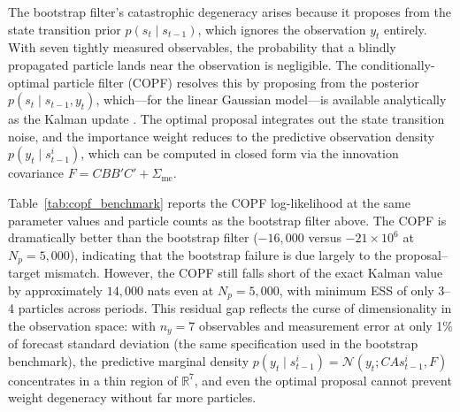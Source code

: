 \documentclass[12pt]{article}
\theoremstyle{plain}
\theoremstyle{definition}
\theoremstyle{remark}
\begin{document}
The bootstrap filter's catastrophic degeneracy arises because it proposes from the state transition prior $p(s_t \mid s_{t-1})$, which ignores the observation $y_t$ entirely. With seven tightly measured observables, the probability that a blindly propagated particle lands near the observation is negligible. The conditionally-optimal particle filter (COPF) resolves this by proposing from the posterior $p(s_t \mid s_{t-1}, y_t)$, which---for the linear Gaussian model---is available analytically as the Kalman update \citep{doucet2001sequential,fernandezvillaverde2007estimating}. The optimal proposal integrates out the state transition noise, and the importance weight reduces to the predictive observation density $p(y_t \mid s_{t-1}^i)$, which can be computed in closed form via the innovation covariance $F = C B B' C' + \Sigma_{\text{me}}$.

Table~\ref{tab:copf_benchmark} reports the COPF log-likelihood at the same parameter values and particle counts as the bootstrap filter above. The COPF is dramatically better than the bootstrap filter ($-16{,}000$ versus $-21 \times 10^6$ at $N_p = 5{,}000$), indicating that the bootstrap failure is due largely to the proposal--target mismatch. However, the COPF still falls short of the exact Kalman value by approximately $14{,}000$ nats even at $N_p = 5{,}000$, with minimum ESS of only 3--4 particles across periods. This residual gap reflects the curse of dimensionality in the observation space: with $n_y = 7$ observables and measurement error at only 1\% of forecast standard deviation (the same specification used in the bootstrap benchmark), the predictive marginal density $p(y_t \mid s_{t-1}^i) = \mathcal{N}(y_t; CA s_{t-1}^i, F)$ concentrates in a thin region of $\mathbb{R}^7$, and even the optimal proposal cannot prevent weight degeneracy without far more particles.
\end{document}
